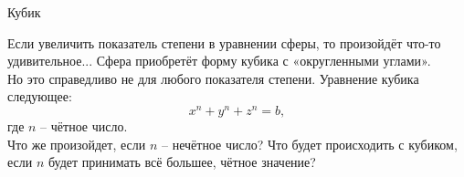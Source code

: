 \documentclass[ru]{./../../common/SurferDesc}%
\begin{document}
\footnotesize
%

\begin{surferPage}
  \begin{surferTitle}Кубик\end{surferTitle}
   \begin{surferText}
   
Если увеличить показатель степени в уравнении сферы, то произойдёт что-то удивительное... Сфера приобретёт форму кубика с «округленными углами».\\
\vspace{0.3cm}
 Но это справедливо не для любого показателя степени. Уравнение кубика следующее:
\[x^n+y^n+z^n=b,\]
где $n$ – чётное число.\\
\vspace{0.3cm}
Что же произойдет, если $n$ – нечётное число? Что будет происходить с кубиком, если $n$ будет принимать всё большее, чётное значение?
     \end{surferText}
\end{surferPage}
\end{document}
